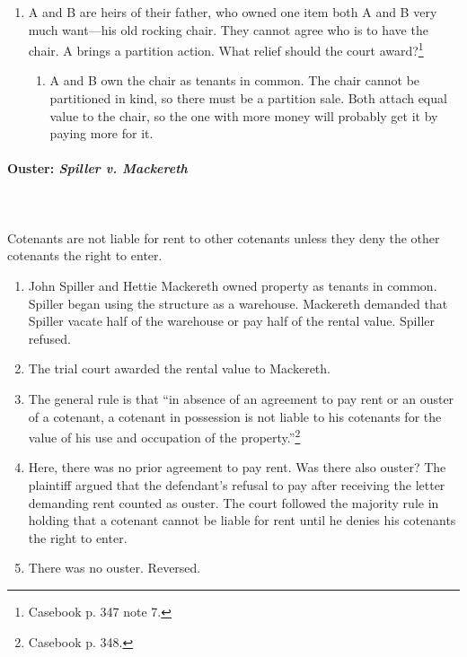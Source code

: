 \begin{enumerate}
    \item A and B are heirs of their father, who owned one item both A and B 
    very much want---his old rocking chair. They cannot agree who is to have 
    the chair. A brings a partition action. What relief should the court 
    award?\footnote{Casebook p. 347 note 7.}
    \begin{enumerate}
        \item A and B own the chair as tenants in common. The chair cannot be 
        partitioned in kind, so there must be a partition sale. Both attach 
        equal value to the chair, so the one with more money will probably get 
        it by paying more for it.
    \end{enumerate}
\end{enumerate}

\paragraph{Ouster: \emph{Spiller v. Mackereth}}
~\\\\Cotenants are not liable for rent to other cotenants unless they deny the 
other cotenants the right to enter.

\begin{enumerate}
    \item John Spiller and Hettie Mackereth owned property as tenants in 
    common. Spiller began using the structure as a warehouse. Mackereth 
    demanded that Spiller vacate half of the warehouse or pay half of the 
    rental value. Spiller refused.
    \item The trial court awarded the rental value to Mackereth.
    \item The general rule is that ``in absence of an agreement to pay rent or 
    an ouster of a cotenant, a cotenant in possession is not liable to his 
    cotenants for the value of his use and occupation of the 
    property.''\footnote{Casebook p. 348.}
    \item Here, there was no prior agreement to pay rent. Was there also 
    ouster? The plaintiff argued that the defendant's refusal to pay after 
    receiving the letter demanding rent counted as ouster. The court followed 
    the majority rule in holding that a cotenant cannot be liable for rent 
    until he denies his cotenants the right to enter.
    \item There was no ouster. Reversed.
\end{enumerate}

